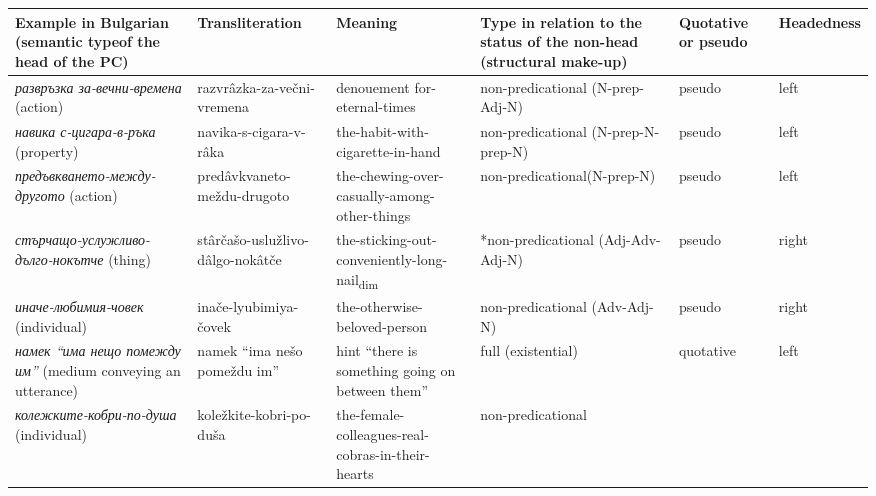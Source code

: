 \documentclass[output=paper]{LSP/langsci}
\begin{document}
\begin{sidewaystable}
\footnotesize
\begin{tabularx}{\textwidth}{QQQQp{1.5cm}l}
\lsptoprule
\textbf{Example in Bulgarian}\footnotemark[4]
\newline 
\textbf{(semantic type}\footnotemark[5] \textbf{of the head of the PC)} & \textbf{Transliteration} & \textbf{Meaning} & \textbf{Type in relation to the  status of the non-head (structural make-up)} & \textbf{Quotative or pseudo} & \textbf{Headedness}\\
\midrule

\textit{{развръзка за-вечни-времена}}
\newline 
(action) & razvrâzka-za-večni-vremena & denouement for-eternal-times & non-predicational (N-prep-Adj-N) & pseudo & left\\
\textit{{навика с-цигара-в-ръка}}
\newline 
(property) & navika-s-cigara-v-râka & the-habit-with-cigarette-in-hand & non-predicational (N-prep-N-prep-N) & pseudo & left\\
\textit{{предъвкването-между-другото}}
\newline 
(action) & predâvkvaneto-meždu-drugoto & the-chewing-over-casually-among-other-things & non-predicational(N-prep-N) & pseudo & left\\
\textit{{стърчащо-услужливо-дълго-нокътче}}
\newline 
(thing) & stârčašo-uslužlivo-dâlgo-nokâtče & the-sticking-out-conveniently-long-nail\textsubscript{dim} & *\footnotemark[7] non-predicational
\newline 
(Adj-Adv-Adj-N) & pseudo & right\\
\textit{{иначе-любимия-човек}}
\newline 
(individual) & inače-lyubimiya-čovek & the-otherwise-beloved-person & non-predicational
\newline 
(Adv-Adj-N) & pseudo & right\\
\textit{{намек “има нещо помежду им”}}
\newline 
(medium conveying an utterance) & namek “ima nešo pomeždu im” & hint “there is something going on between them” & full 
\newline 
(existential) & quotative & left\\
\textit{{колежките-кобри-по-душа}}
\newline 
(individual) & koležkite-kobri-po-duša & the-female-colleagues-real-cobras-in-their-hearts & non-predicational
\newline 

\end{tabularx}
\end{sidewaystable}
\end{document}
